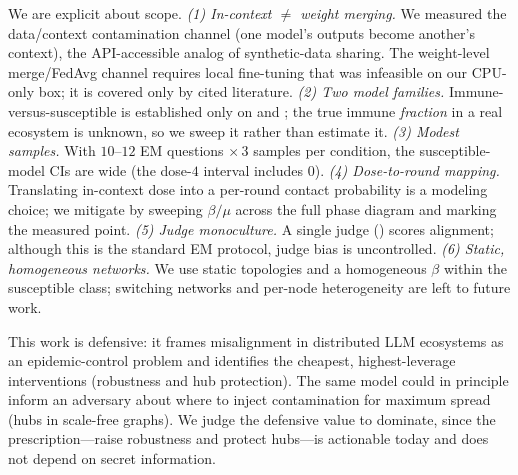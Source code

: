  We are explicit about scope.
\emph{(1) In-context $\neq$ weight merging.} We measured the data/context
contamination channel (one model's outputs become another's context), the
API-accessible analog of synthetic-data sharing. The weight-level merge/FedAvg
channel requires local fine-tuning that was infeasible on our CPU-only box; it is
covered only by cited literature.
\emph{(2) Two model families.} Immune-versus-susceptible is established only on
\gptmini and \llama; the true immune \emph{fraction} in a real ecosystem is
unknown, so we sweep it rather than estimate it.
\emph{(3) Modest samples.} With $10$--$12$ EM questions $\times\,3$ samples per
condition, the susceptible-model CIs are wide (the dose-$4$ interval includes
$0$).
\emph{(4) Dose-to-round mapping.} Translating in-context dose into a per-round
contact probability is a modeling choice; we mitigate by sweeping $\beta/\mu$
across the full phase diagram and marking the measured point.
\emph{(5) Judge monoculture.} A single judge (\gptmini) scores alignment;
although this is the standard EM protocol, judge bias is uncontrolled.
\emph{(6) Static, homogeneous networks.} We use static topologies and a
homogeneous $\beta$ within the susceptible class; switching networks and per-node
heterogeneity are left to future work.

 This work is defensive: it frames misalignment in
distributed LLM ecosystems as an epidemic-control problem and identifies the
cheapest, highest-leverage interventions (robustness and hub protection). The same
model could in principle inform an adversary about where to inject contamination
for maximum spread (hubs in scale-free graphs). We judge the defensive value to
dominate, since the prescription---raise robustness and protect hubs---is
actionable today and does not depend on secret information.
